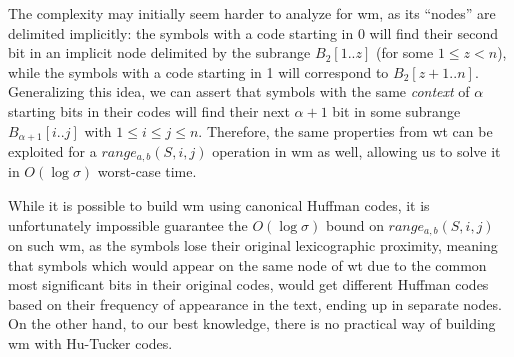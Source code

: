 	The complexity may initially seem harder to analyze for \gls{wm}, as its ``nodes'' are delimited implicitly: the symbols with a code starting in 0 will find their second bit in an implicit node delimited by the subrange $B_2[1..z]$ (for some $1 \leq z < n$), while the symbols with a code starting in 1 will correspond to $B_2[z+1..n]$. Generalizing this idea, we can assert that symbols with the same \textit{context} of $\alpha$ starting bits in their codes will find their next $\alpha+1$ bit in some subrange $B_{\alpha+1}[i..j]$ with $1 \leq i \leq j \leq n$. Therefore, the same properties from \gls{wt} can be exploited for a $range_{a,b}(S,i,j)$ operation in \gls{wm} as well, allowing us to solve it in $O(\log\sigma)$ worst-case time.

	While it is possible to build \gls{wm} using canonical Huffman codes, it is unfortunately impossible guarantee the $O(\log\sigma)$ bound on $range_{a,b}(S,i,j)$ on such \gls{wm}, as the symbols lose their original lexicographic proximity, meaning that symbols which would appear on the same node of \gls{wt} due to the common most significant bits in their original codes, would get different Huffman codes based on their frequency of appearance in the text, ending up in separate nodes. On the other hand, to our best knowledge, there is no practical way of building \gls{wm} with Hu-Tucker codes.


